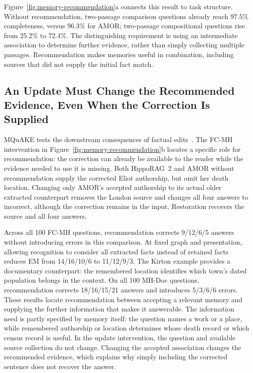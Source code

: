 Figure~\ref{fig:memory-recommendation}a connects this result to task structure.
Without recommendation, two-passage comparison questions already reach 97.5\% completeness, versus 96.3\% for AMOR; two-passage compositional questions rise from 25.2\% to 72.4\%.
The distinguishing requirement is using an intermediate association to determine further evidence, rather than simply collecting multiple passages.
Recommendation makes memories useful in combination, including sources that did not supply the initial fact match.

\subsection{An Update Must Change the Recommended Evidence, Even When the Correction Is Supplied}

MQuAKE tests the downstream consequences of factual edits~\citep{zhong-etal-2023-mquake}.
The FC-MH intervention in Figure~\ref{fig:memory-recommendation}b locates a specific role for recommendation: the correction can already be available to the reader while the evidence needed to use it is missing.
Both HippoRAG~2 and AMOR without recommendation supply the corrected Eliot authorship, but omit her death location.
Changing only AMOR's accepted authorship to its actual older extracted counterpart removes the London source and changes all four answers to incorrect, although the correction remains in the input.
Restoration recovers the source and all four answers.

Across all 100 FC-MH questions, recommendation corrects 9/12/6/5 answers without introducing errors in this comparison.
At fixed graph and presentation, allowing recognition to consider all extracted facts instead of retained facts reduces EM from 14/16/10/6 to 11/12/9/3.
The Kirton example provides a documentary counterpart: the remembered location identifies which town's dated population belongs in the context.
On all 100 MH-Doc questions, recommendation corrects 18/16/15/21 answers and introduces 5/3/6/6 errors.
These results locate recommendation between accepting a relevant memory and supplying the further information that makes it answerable.
The information need is partly specified by memory itself: the question names a work or a place, while remembered authorship or location determines whose death record or which census record is useful.
In the update intervention, the question and available source collection do not change.
Changing the accepted association changes the recommended evidence, which explains why simply including the corrected sentence does not recover the answer.

